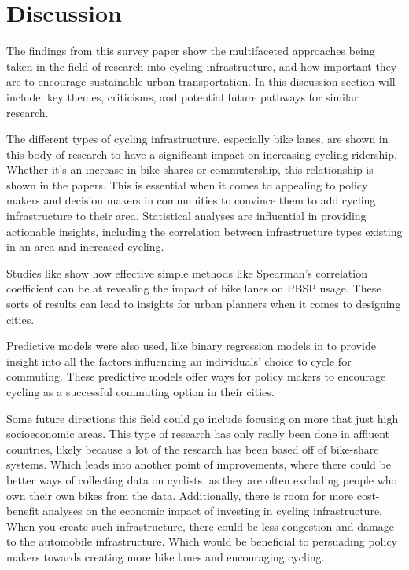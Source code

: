\documentclass[12pt, letterpaper]{article}
\begin{document}
\section{Discussion}
\label{sec:disc}

The findings from this survey paper show the multifaceted approaches being taken in the field of research into cycling infrastructure, and how important they are to encourage sustainable urban transportation. In this discussion section will include; key themes, criticisms, and potential future pathways for similar research. \par

The different types of cycling infrastructure, especially bike lanes, are shown in this body of research to have a significant impact on increasing cycling ridership. Whether it's an increase in bike-shares or commutership, this relationship is shown in the papers. This is essential when it comes to appealing to policy makers and decision makers in communities to convince them to add cycling infrastructure to their area. Statistical analyses are influential in providing actionable insights, including the correlation between infrastructure types existing in an area and increased cycling. \par

Studies like \citet{1MateoBabiano2016} show how effective simple methods like Spearman's correlation coefficient can be at revealing the impact of bike lanes on PBSP usage. These sorts of results can lead to insights for urban planners when it comes to designing cities. \par

Predictive models were also used, like binary regression models in \citet{2Yujun2019} to provide insight into all the factors influencing an individuals' choice to cycle for commuting. These predictive models offer ways for policy makers to encourage cycling as a successful commuting option in their cities.\par

Some future directions this field could go include focusing on more that just high socioeconomic areas. This type of research has only really been done in affluent countries, likely because a lot of the research has been based off of bike-share systems. Which leads into another point of improvements, where there could be better ways of collecting data on cyclists, as they are often excluding people who own their own bikes from the data. Additionally, there is room for more cost-benefit analyses on the economic impact of investing in cycling infrastructure. When you create such infrastructure, there could be less congestion and damage to the automobile infrastructure. Which would be beneficial to persuading policy makers towards creating more bike lanes and encouraging cycling. 
\end{document}
